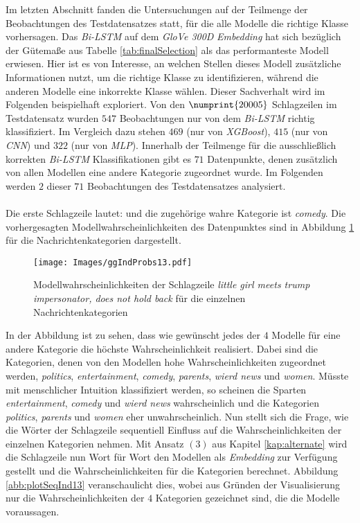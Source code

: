 \documentclass[a4paper,11pt]{article}
\begin{document}
Im letzten Abschnitt fanden die Untersuchungen auf der Teilmenge der Beobachtungen des Testdatensatzes statt, für die alle Modelle die richtige Klasse vorhersagen. Das \textit{Bi-LSTM} auf dem \textit{GloVe 300D} \textit{Embedding} hat sich bezüglich der Gütemaße aus Tabelle \ref{tab:finalSelection} als das performanteste Modell erwiesen. Hier ist es von Interesse, an welchen Stellen dieses Modell zusätzliche Informationen nutzt, um die richtige Klasse zu identifizieren, während die anderen Modelle eine inkorrekte Klasse wählen. Dieser Sachverhalt wird im Folgenden beispielhaft exploriert. Von den $\numprint{20005}$ Schlagzeilen im Testdatensatz wurden $547$ Beobachtungen nur von dem \textit{Bi-LSTM} richtig klassifiziert. Im Vergleich dazu stehen $469$ (nur von \textit{XGBoost}), $415$ (nur von \textit{CNN}) und $322$ (nur von \textit{MLP}). Innerhalb der Teilmenge für die ausschließlich korrekten \textit{Bi-LSTM} Klassifikationen gibt es $71$ Datenpunkte, denen zusätzlich von allen Modellen eine andere Kategorie zugeordnet wurde. Im Folgenden werden $2$ dieser $71$ Beobachtungen des Testdatensatzes analysiert. \\
\\
Die erste Schlagzeile lautet:  und die zugehörige wahre Kategorie ist \textit{comedy}. Die vorhergesagten Modellwahrscheinlichkeiten des Datenpunktes sind in Abbildung \ref{abb:IndProbs13}  für die Nachrichtenkategorien dargestellt.

\begin{figure}[H]
    \centering
\texttt{[image: Images/ggIndProbs13.pdf]} 
\caption{Modellwahrscheinlichkeiten der Schlagzeile \textit{little girl meets trump impersonator, does not hold back} für die einzelnen Nachrichtenkategorien}
\label{abb:IndProbs13}
\end{figure}

In der Abbildung ist zu sehen, dass wie gewünscht jedes der $4$ Modelle für eine andere Kategorie die höchste Wahrscheinlichkeit realisiert. Dabei sind die Kategorien, denen von den Modellen hohe Wahrscheinlichkeiten zugeordnet werden, \textit{politics}, \textit{entertainment}, \textit{comedy}, \textit{parents}, \textit{wierd news} und \textit{women}. Müsste mit menschlicher Intuition klassifiziert werden, so scheinen die Sparten \textit{entertainment}, \textit{comedy} und \textit{wierd news} wahrscheinlich und die Kategorien \textit{politics}, \textit{parents} und \textit{women} eher unwahrscheinlich. Nun stellt sich die Frage, wie die Wörter der Schlagzeile sequentiell Einfluss auf die Wahrscheinlichkeiten der einzelnen Kategorien nehmen. Mit Ansatz $(3)$ aus Kapitel \ref{kap:alternate} wird die Schlagzeile nun Wort für Wort den Modellen als \textit{Embedding} zur Verfügung gestellt und die Wahrscheinlichkeiten für die Kategorien berechnet. Abbildung \ref{abb:plotSeqInd13} veranschaulicht dies, wobei aus Gründen der Visualisierung nur die Wahrscheinlichkeiten der $4$ Kategorien gezeichnet sind, die die Modelle voraussagen.
\end{document}

